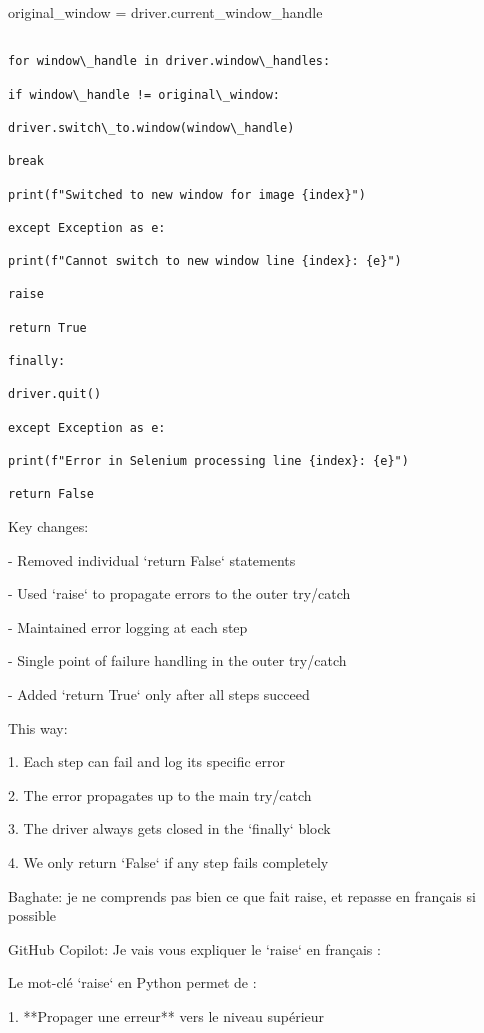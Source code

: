 original\_window = driver.current\_window\_handle

\begin{verbatim}

for window\_handle in driver.window\_handles:

if window\_handle != original\_window:

driver.switch\_to.window(window\_handle)

break

print(f"Switched to new window for image {index}")

except Exception as e:

print(f"Cannot switch to new window line {index}: {e}")

raise

return True

finally:

driver.quit()

except Exception as e:

print(f"Error in Selenium processing line {index}: {e}")

return False

\end{verbatim}

Key changes:

- Removed individual `return False` statements

- Used `raise` to propagate errors to the outer try/catch

- Maintained error logging at each step

- Single point of failure handling in the outer try/catch

- Added `return True` only after all steps succeed

This way:

1. Each step can fail and log its specific error

2. The error propagates up to the main try/catch

3. The driver always gets closed in the `finally` block

4. We only return `False` if any step fails completely

Baghate: je ne comprends pas bien ce que fait raise, et repasse en français si possible

GitHub Copilot: Je vais vous expliquer le `raise` en français :

Le mot-clé `raise` en Python permet de :

1. **Propager une erreur** vers le niveau supérieur

